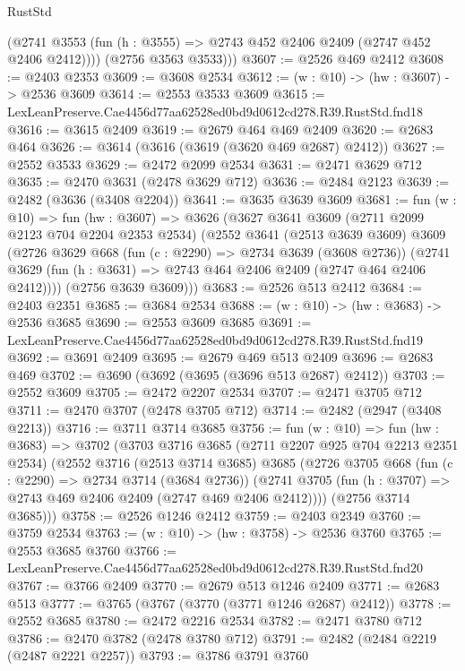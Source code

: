 \begin{lexlean}{RustStd}
\begin{coremodule}
          (@2741 @3553 (fun (h : @3555) => @2743 @452 @2406 @2409 (@2747 @452 @2406 @2412))))
        (@2756 @3563 @3533)))
@3607 := @2526 @469 @2412
@3608 := @2403 @2353
@3609 := @3608 @2534
@3612 := (w : @10) -> (hw : @3607) -> @2536 @3609
@3614 := @2553 @3533 @3609
@3615 := LexLeanPreserve.Cae4456d77aa62528ed0bd9d0612cd278.R39.RustStd.fnd18
@3616 := @3615 @2409
@3619 := @2679 @464 @469 @2409
@3620 := @2683 @464
@3626 := @3614 (@3616 (@3619 (@3620 @469 @2687) @2412))
@3627 := @2552 @3533
@3629 := @2472 @2099 @2534
@3631 := @2471 @3629 @712
@3635 := @2470 @3631 (@2478 @3629 @712)
@3636 := @2484 @2123
@3639 := @2482 (@3636 (@3408 @2204))
@3641 := @3635 @3639 @3609
@3681 := fun (w : @10) =>
  fun (hw : @3607) =>
  @3626
    (@3627
      @3641
      @3609
      (@2711 @2099 @2123 @704 @2204 @2353 @2534)
      (@2552
        @3641
        (@2513 @3639 @3609)
        @3609
        (@2726
          @3629
          @668
          (fun (c : @2290) => @2734 @3639 (@3608 @2736))
          (@2741 @3629 (fun (h : @3631) => @2743 @464 @2406 @2409 (@2747 @464 @2406 @2412))))
        (@2756 @3639 @3609)))
@3683 := @2526 @513 @2412
@3684 := @2403 @2351
@3685 := @3684 @2534
@3688 := (w : @10) -> (hw : @3683) -> @2536 @3685
@3690 := @2553 @3609 @3685
@3691 := LexLeanPreserve.Cae4456d77aa62528ed0bd9d0612cd278.R39.RustStd.fnd19
@3692 := @3691 @2409
@3695 := @2679 @469 @513 @2409
@3696 := @2683 @469
@3702 := @3690 (@3692 (@3695 (@3696 @513 @2687) @2412))
@3703 := @2552 @3609
@3705 := @2472 @2207 @2534
@3707 := @2471 @3705 @712
@3711 := @2470 @3707 (@2478 @3705 @712)
@3714 := @2482 (@2947 (@3408 @2213))
@3716 := @3711 @3714 @3685
@3756 := fun (w : @10) =>
  fun (hw : @3683) =>
  @3702
    (@3703
      @3716
      @3685
      (@2711 @2207 @925 @704 @2213 @2351 @2534)
      (@2552
        @3716
        (@2513 @3714 @3685)
        @3685
        (@2726
          @3705
          @668
          (fun (c : @2290) => @2734 @3714 (@3684 @2736))
          (@2741 @3705 (fun (h : @3707) => @2743 @469 @2406 @2409 (@2747 @469 @2406 @2412))))
        (@2756 @3714 @3685)))
@3758 := @2526 @1246 @2412
@3759 := @2403 @2349
@3760 := @3759 @2534
@3763 := (w : @10) -> (hw : @3758) -> @2536 @3760
@3765 := @2553 @3685 @3760
@3766 := LexLeanPreserve.Cae4456d77aa62528ed0bd9d0612cd278.R39.RustStd.fnd20
@3767 := @3766 @2409
@3770 := @2679 @513 @1246 @2409
@3771 := @2683 @513
@3777 := @3765 (@3767 (@3770 (@3771 @1246 @2687) @2412))
@3778 := @2552 @3685
@3780 := @2472 @2216 @2534
@3782 := @2471 @3780 @712
@3786 := @2470 @3782 (@2478 @3780 @712)
@3791 := @2482 (@2484 @2219 (@2487 @2221 @2257))
@3793 := @3786 @3791 @3760

\end{coremodule}
\end{lexlean}
